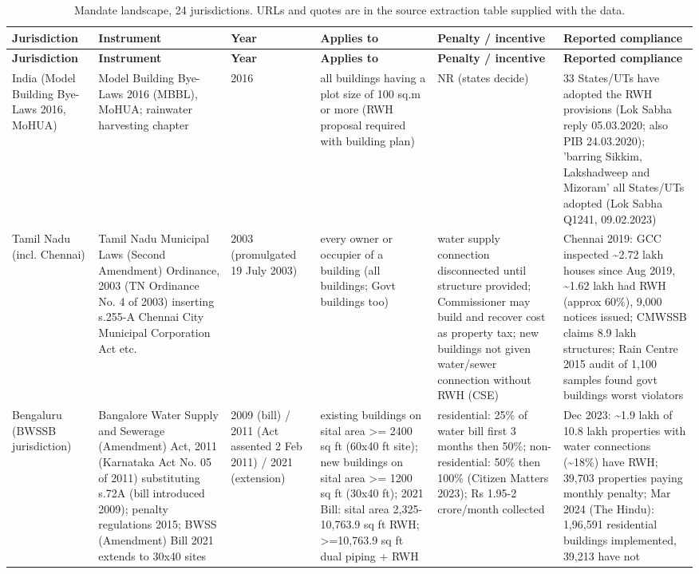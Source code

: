 {\tiny\setlength{\tabcolsep}{3pt}
\begin{longtable}{p{2.1cm} p{3cm} p{1.3cm} p{3cm} p{2.9cm} p{3.4cm}}
\caption{Mandate landscape, 24 jurisdictions. URLs and quotes are in the source extraction table supplied with the data.}\label{tab:mandates}\\
\toprule
\textbf{Jurisdiction} & \textbf{Instrument} & \textbf{Year} & \textbf{Applies to} & \textbf{Penalty / incentive} & \textbf{Reported compliance}\\ \midrule\endfirsthead
\toprule \textbf{Jurisdiction} & \textbf{Instrument} & \textbf{Year} & \textbf{Applies to} & \textbf{Penalty / incentive} & \textbf{Reported compliance}\\ \midrule\endhead
\bottomrule\endfoot
India (Model Building Bye-Laws 2016, MoHUA) & Model Building Bye-Laws 2016 (MBBL), MoHUA; rainwater harvesting chapter & 2016 & all buildings having a plot size of 100 sq.m or more (RWH proposal required with building plan) & NR (states decide) & 33 States/UTs have adopted the RWH provisions (Lok Sabha reply 05.03.2020; also PIB 24.03.2020); 'barring Sikkim, Lakshadweep and Mizoram' all States/UTs adopted (Lok Sabha Q1241, 09.02.2023)\\
Tamil Nadu (incl. Chennai) & Tamil Nadu Municipal Laws (Second Amendment) Ordinance, 2003 (TN Ordinance No. 4 of 2003) inserting s.255-A Chennai City Municipal Corporation Act etc. & 2003 (promulgated 19 July 2003) & every owner or occupier of a building (all buildings; Govt buildings too) & water supply connection disconnected until structure provided; Commissioner may build and recover cost as property tax; new buildings not given water/sewer connection without RWH (CSE) & Chennai 2019: GCC inspected \textasciitilde 2.72 lakh houses since Aug 2019, \textasciitilde 1.62 lakh had RWH (approx 60\%), 9,000 notices issued; CMWSSB claims 8.9 lakh structures; Rain Centre 2015 audit of 1,100 samples found govt buildings worst violators\\
Bengaluru (BWSSB jurisdiction) & Bangalore Water Supply and Sewerage (Amendment) Act, 2011 (Karnataka Act No. 05 of 2011) substituting s.72A (bill introduced 2009); penalty regulations 2015; BWSS (Amendment) Bill 2021 extends to 30x40 sites & 2009 (bill) / 2011 (Act assented 2 Feb 2011) / 2021 (extension) & existing buildings on sital area >= 2400 sq ft (60x40 ft site); new buildings on sital area >= 1200 sq ft (30x40 ft); 2021 Bill: sital area 2,325-10,763.9 sq ft RWH; >=10,763.9 sq ft dual piping + RWH & residential: 25\% of water bill first 3 months then 50\%; non-residential: 50\% then 100\% (Citizen Matters 2023); Rs 1.95-2 crore/month collected & Dec 2023: \textasciitilde 1.9 lakh of 10.8 lakh properties with water connections (\textasciitilde 18\%) have RWH; 39,703 properties paying monthly penalty; Mar 2024 (The Hindu): 1,96,591 residential buildings implemented, 39,213 have not\\

\end{longtable}}
